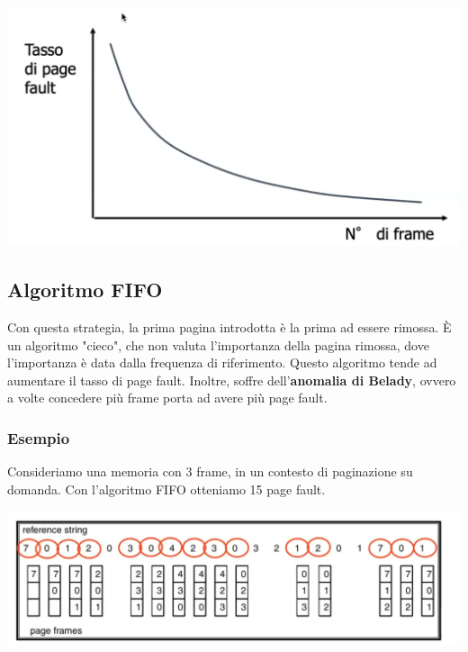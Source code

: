 \documentclass[a4paper,12pt, twoside]{report}
\begin{document}
\begin{center}
    \includegraphics[scale=0.135]{page_vs_frame}
\end{center} 

\subsection{Algoritmo FIFO}
Con questa strategia, la prima pagina introdotta \`e la prima ad essere rimossa. \`E un algoritmo "cieco",
che non valuta l'importanza della pagina rimossa, dove l'importanza \`e data dalla frequenza di riferimento.
Questo algoritmo tende ad aumentare il tasso di page fault. Inoltre, soffre dell'\textbf{anomalia di Belady},
ovvero a volte concedere pi\`u frame porta ad avere pi\`u page fault. 

\subsubsection{Esempio}

Consideriamo una memoria con 3 frame, in un contesto di paginazione su domanda. Con l'algoritmo FIFO otteniamo 15 page 
fault. 
\begin{center}
    \includegraphics[scale=0.2]{page_faultFIFO}
\end{center} 
\end{document}
